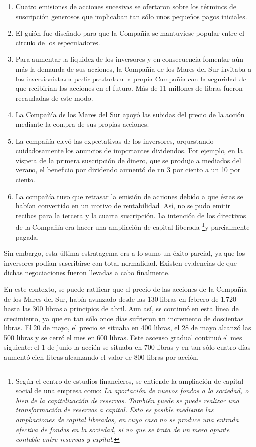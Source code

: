 \begin{enumerate}
	\item Cuatro emisiones de acciones sucesivas se ofertaron sobre los términos de suscripción generosos que implicaban tan sólo unos pequeños pagos iniciales.
	\item El guión fue diseñado para que la Compañía se mantuviese popular entre el círculo de los especuladores.
	\item Para aumentar la liquidez de los inversores y en consecuencia fomentar aún más la demanda de sus acciones, la Compañía de los Mares del Sur invitaba a los inversionistas a pedir prestado a la propia Compañía con la seguridad de que recibirían las acciones en el futuro. Más de 11 millones de libras fueron recaudadas de este modo.
	\item La Compañía de los Mares del Sur apoyó las subidas del precio de la acción mediante la compra de sus propias acciones.
	\item La compañía elevó las expectativas de los inversores, orquestando cuidadosamente los anuncios de importantes dividendos. Por ejemplo, en la víspera de la primera suscripción de dinero, que se produjo a mediados del verano, el beneficio por dividendo aumentó de un 3 por ciento a un 10 por ciento.
	\item La compañía tuvo que retrasar la emisión de acciones debido a que éstas se habían convertido en un motivo de rentabilidad. Así, no se pudo emitir recibos para la tercera y la cuarta suscripción. La intención de los directivos de la Compañía era hacer una ampliación de capital liberada \footnote{Según el centro de estudios financieros, se entiende la ampliación de capital social de una empresa como: \emph{La aportación de nuevos fondos a la sociedad, o bien de la capitalización de reservas. También puede se puede realizar una transformación de reservas a capital. Esto es posible mediante las ampliaciones de capital liberadas, en cuyo caso no se produce una entrada efectiva de fondos en la sociedad, si no que se trata de un mero apunte contable entre reservas y capital}.}y parcialmente pagada.
\end{enumerate}

Sin embargo, esta última estratagema era a lo sumo un éxito parcial, ya que los inversores podían suscribirse con total normalidad. Existen evidencias de que dichas negociaciones fueron llevadas a cabo finalmente. 

En este contexto, se puede ratificar que el precio de las acciones de la Compañía de los Mares del Sur, había avanzado desde las 130 libras en febrero de 1.720 hasta las 300 libras a principios de abril. Aun así, se continuó en esta línea de crecimiento, ya que en tan sólo once días sufrieron un incremento de doscientas libras. El 20 de mayo, el precio se situaba en 400 libras, el 28 de mayo alcanzó las 500 libras y se cerró el mes en 600 libras. Este ascenso gradual continuó el mes siguiente: el 1 de junio la acción se situaba en 700 libras y en tan sólo cuatro días aumentó cien libras alcanzando el valor de 800 libras por acción.

